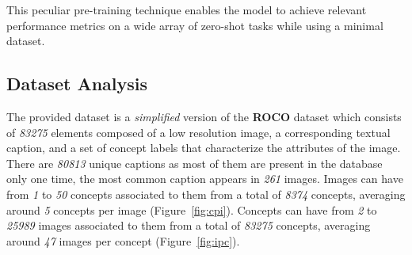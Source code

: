 \documentclass[10pt,twocolumn,letterpaper]{article}
\begin{document}
This peculiar pre-training technique enables the model to achieve relevant performance metrics on a wide array of zero-shot tasks while using a minimal dataset.

\subsection{Dataset Analysis}




The provided dataset is a \textit{simplified} version of the \textbf{ROCO} dataset\cite{roco} which consists of \textit{83275} elements composed of a low resolution image, a corresponding textual caption, and a set of concept labels that characterize the attributes of the image.
There are \textit{80813} unique captions as most of them are present in the database only one time, the most common caption appears in \textit{261} images.
Images can have from \textit{1} to \textit{50} concepts associated to them from a total of \textit{8374} concepts, averaging around \textit{5} concepts per image (Figure\ \ref{fig:cpi}).
Concepts can have from \textit{2} to \textit{25989} images associated to them from a total of \textit{83275} concepts, averaging around \textit{47} images per concept (Figure\ \ref{fig:ipc}).
\end{document}
